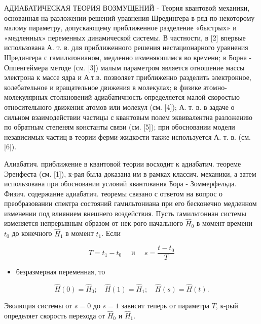 \documentclass[10pt]{article}
\begin{document}
АДИАБАТИЧЕСКАЯ ТЕОРИЯ ВОЗМУЩЕНИЙ - Теория квантовой механики, основанная на разложении решений уравнения Шредингера в ряд по некоторому малому параметру, допускающему приближенное разделение «быстрых» и «медленных» переменных динамической системы. В частности, в [2] впервые использована А. т. в. для приближенного решения нестационарного уравнения Шредингера с гамильтонианом, медленно изменяюшимся во времени; в Борна - Оппенгеймера методе (см. [3]) малым параметром является отношение массы электрона к массе ядра и А.т.в. позволяет приближенно разделить электронное, колебательное и вращательное движения в молекулах; в физике атомно-молекулярных столкновений адиабатичность определяется малой скоростью относительного движения атомов или молекул (см. [4]); А. т. в. в задаче о сильном взаимодействии частицы с квантовым полем эквивалентна разложению по обратным степеням константы связи (см. [5]); при обосновании модели независимых частиц в теории ферми-жидкости также используется А. т. в. (см. [6]).



Алиабатич. приближение в квантовой теории восходит к адиабатич. теореме Эренфеста (см. [1]), к-рая была доказана им в рамках классич. механики, а затем использована при обосновании условий квантования Бора - Зоммерфельда. Физич. содержание адиабатич. теоремы связано с ответом на вопрос о преобразовании спектра состояний гамильтониана при его бесконечно медленном изменении под влиянием внешнего воздействия. Пусть гамильтониан системы изменяется непрерывным образом от нек-рого начального $\hat{H}_{0}$ в момент времени $t_{0}$ до конечного $\hat{H}_{1}$ в момент $t_{1}$. Если



\[

T=t_{1}-t_{0} \quad \text { и } \quad s=\frac{t-t_{0}}{T}

\]



\begin{itemize}

  \item безразмерная переменная, то

\end{itemize}



\[

\hat{H}(0)=\hat{H}_{0} ; \quad \hat{H}(1)=\hat{H}_{1} ; \quad \hat{H}(s)=\hat{H}(t) .

\]



Эволюция системы от $s=0$ до $s=1$ зависит теперь от параметра $T$, к-рый определяет скорость перехода от $\hat{H}_{0}$ и $\hat{H}_{1}$.
\end{document}
